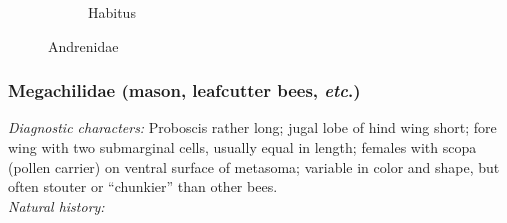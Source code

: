 \documentclass[letterpaper, 11pt]{article}
\begin{document}
\begin{figure}[ht!]
\begin{subfigure}[ht!]{0.37\textwidth}
        \caption{Habitus \citep[][Fig. 116]{goulet1993hymenoptera}}
        \label{fig:andrenid2}
    \end{subfigure}
    \caption{Andrenidae}\label{fig:andrenids}
\end{figure}

\subsubsection{Megachilidae (mason, leafcutter bees, \textit{etc}.)}
\noindent{}\textit{Diagnostic characters:} Proboscis rather long; jugal lobe of hind wing short; fore wing with two submarginal cells, usually equal in length; females with scopa (pollen carrier) on ventral surface of metasoma; variable in color and shape, but often stouter or ``chunkier'' than other bees.\\

\noindent{}\textit{Natural history:} \\
\end{document}
